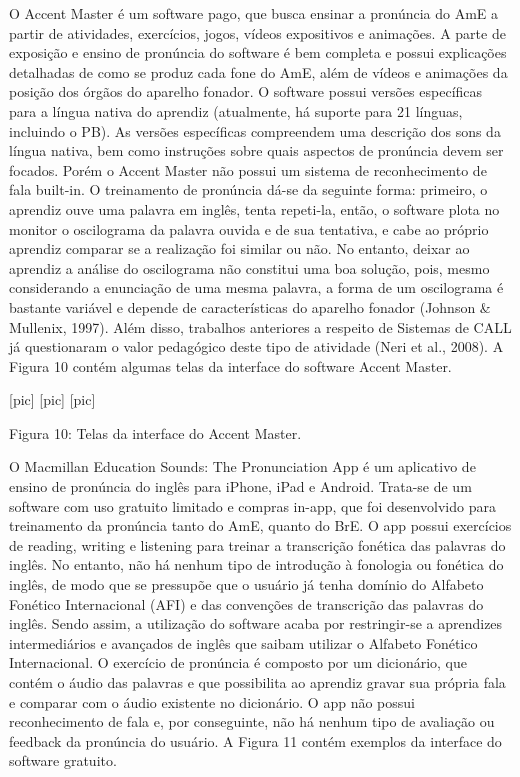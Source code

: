 O Accent Master \'e um software pago, que busca ensinar a pron\'uncia do AmE
a partir de atividades, exerc\'icios, jogos, v\'ideos expositivos e
anima\c{c}\~oes. A parte de exposi\c{c}\~ao e ensino de pron\'uncia do software \'e bem
completa e possui explica\c{c}\~oes detalhadas de como se produz cada fone do
AmE, al\'em de v\'ideos e anima\c{c}\~oes da posi\c{c}\~ao dos \'org\~aos do aparelho
fonador. O software possui vers\~oes espec\'ificas para a l\'ingua nativa do
aprendiz (atualmente, h\'a suporte para 21 l\'inguas, incluindo o PB). As
vers\~oes espec\'ificas compreendem uma descri\c{c}\~ao dos sons da l\'ingua nativa,
bem como instru\c{c}\~oes sobre quais aspectos de pron\'uncia devem ser focados.
Por\'em o Accent Master n\~ao possui um sistema de reconhecimento de fala
built-in. O treinamento de pron\'uncia d\'a-se da seguinte forma: primeiro,
o aprendiz ouve uma palavra em ingl\^es, tenta repeti-la, ent\~ao, o
software plota no monitor o oscilograma da palavra ouvida e de sua
tentativa, e cabe ao pr\'oprio aprendiz comparar se a realiza\c{c}\~ao foi
similar ou n\~ao. No entanto, deixar ao aprendiz a an\'alise do oscilograma
n\~ao constitui uma boa solu\c{c}\~ao, pois, mesmo considerando a enuncia\c{c}\~ao de
uma mesma palavra, a forma de um oscilograma \'e bastante vari\'avel e
depende de caracter\'isticas do aparelho fonador (Johnson \& Mullenix,
1997). Al\'em disso, trabalhos anteriores a respeito de Sistemas de CALL
j\'a questionaram o valor pedag\'ogico deste tipo de atividade (Neri et al.,
2008). A Figura 10 cont\'em algumas telas da interface do software Accent
Master.

                         [pic]  [pic]  [pic]

           Figura 10: Telas da interface do Accent Master.

O Macmillan Education Sounds: The Pronunciation App \'e um aplicativo de
ensino de pron\'uncia do ingl\^es para iPhone, iPad e Android. Trata-se de
um software com uso gratuito limitado e compras in-app, que foi
desenvolvido para treinamento da pron\'uncia tanto do AmE, quanto do BrE.
O app possui exerc\'icios de reading, writing e listening para treinar a
transcri\c{c}\~ao fon\'etica das palavras do ingl\^es. No entanto, n\~ao h\'a nenhum
tipo de introdu\c{c}\~ao à fonologia ou fon\'etica do ingl\^es, de modo que se
pressup\~oe que o usu\'ario j\'a tenha dom\'inio do Alfabeto Fon\'etico
Internacional (AFI) e das conven\c{c}\~oes de transcri\c{c}\~ao das palavras do
ingl\^es. Sendo assim, a utiliza\c{c}\~ao do software acaba por restringir-se a
aprendizes intermedi\'arios e avan\c{c}ados de ingl\^es que saibam utilizar o
Alfabeto Fon\'etico Internacional. O exerc\'icio de pron\'uncia \'e composto por
um dicion\'ario, que cont\'em o \'audio das palavras e que possibilita ao
aprendiz gravar sua pr\'opria fala e comparar com o \'audio existente no
dicion\'ario. O app n\~ao possui reconhecimento de fala e, por conseguinte,
n\~ao h\'a nenhum tipo de avalia\c{c}\~ao ou feedback da pron\'uncia do usu\'ario. A
Figura 11 cont\'em exemplos da interface do software gratuito.

